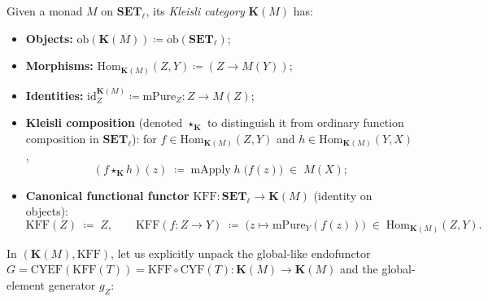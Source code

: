 \documentclass[11pt,a4paper]{article}
\theoremstyle{definition}
\theoremstyle{remark}
\newcommand{\Set}{\mathbf{SET}}
\newcommand{\Hom}{\mathrm{Hom}}
\newcommand{\id}{\mathrm{id}}
\newcommand{\CYF}{\mathrm{CYF}}
\newcommand{\CYEF}{\mathrm{CYEF}}
\newcommand{\KFF}{\mathrm{KFF}}
\newcommand{\K}{\mathbf{K}}
\newcommand{\starK}{\mathbin{\star_{\K}}}
\begin{document}
Given a monad $M$ on $\Set_\ell$, its \emph{Kleisli category} $\K(M)$ has:
\begin{itemize}[nosep]
  \item \textbf{Objects:} $\mathrm{ob}(\K(M)) \coloneqq \mathrm{ob}(\Set_\ell)$;
\vspace{4 pt}  
  \item \textbf{Morphisms:} $\Hom_{\K(M)}(Z, Y) \coloneqq (Z \to M(Y))$;
\vspace{4 pt}  
  \item \textbf{Identities:} $\id_Z^{\K(M)} \coloneqq \mathrm{mPure}_Z : Z \to M(Z)$;
\vspace{4 pt}  
  \item \textbf{Kleisli composition} (denoted $\starK$ to distinguish it from ordinary function
  composition in $\Set_\ell$): for $f \in \Hom_{\K(M)}(Z, Y)$ and $h \in \Hom_{\K(M)}(Y, X)$,
  \begin{equation}\label{eq:kleisli-comp}
    (f \starK h)(z) \;\coloneqq\; \mathrm{mApply}\;h\;\bigl(f(z)\bigr) \;\in\; M(X);
  \end{equation}
\vspace{4 pt}  
  \item \textbf{Canonical functional functor} $\KFF : \Set_\ell \to \K(M)$ (identity on objects):
  \begin{equation}\label{eq:kff}
    \KFF(Z) \;\coloneqq\; Z,
    \qquad
    \KFF(f : Z \to Y) \;\coloneqq\; \bigl(z \mapsto \mathrm{mPure}_Y(f(z))\bigr)
    \;\in\; \Hom_{\K(M)}(Z, Y).
  \end{equation}
\end{itemize}
In $(\K(M), \KFF)$, let us explicitly unpack the global-like endofunctor
$G = \CYEF(\KFF(T)) = \KFF \circ \CYF(T) : \K(M) \to \K(M)$ and the global-element generator $g_Z$:
\end{document}
